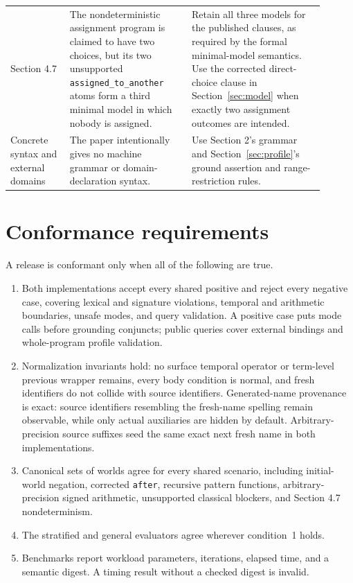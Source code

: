 \documentclass[11pt]{article}
\begin{document}
\begin{longtable}{>{\raggedright\arraybackslash}p{0.17\linewidth}
                  >{\raggedright\arraybackslash}p{0.35\linewidth}
                  >{\raggedright\arraybackslash}p{0.38\linewidth}}
Section 4.7 &
The nondeterministic assignment program is claimed to have two choices, but
its two unsupported \texttt{assigned\_to\_another} atoms form a third
minimal model in which nobody is assigned. &
Retain all three models for the published clauses, as required by the formal
minimal-model semantics.  Use the corrected direct-choice clause in
Section~\ref{sec:model} when exactly two assignment outcomes are intended. \\

Concrete syntax and external domains &
The paper intentionally gives no machine grammar or domain-declaration syntax. &
Use Section 2's grammar and Section~\ref{sec:profile}'s ground assertion and
range-restriction rules. \\
\bottomrule
\end{longtable}

\section{Conformance requirements}

A release is conformant only when all of the following are true.

\begin{enumerate}
  \item Both implementations accept every shared positive and reject every
  negative case, covering lexical and signature violations, temporal and
  arithmetic boundaries, unsafe modes, and query validation.  A positive case
  puts mode calls before grounding conjuncts; public queries cover external
  bindings and whole-program profile validation.
  \item Normalization invariants hold: no surface temporal operator or
  term-level previous wrapper remains, every body condition is normal, and
  fresh identifiers do not collide with source identifiers.  Generated-name
  provenance is exact: source identifiers resembling the fresh-name spelling
  remain observable, while only actual auxiliaries are hidden by default.
  Arbitrary-precision source suffixes seed the same exact next fresh name in
  both implementations.
  \item Canonical sets of worlds agree for every shared scenario, including
  initial-world negation, corrected \verb|after|, recursive pattern
  functions, arbitrary-precision signed arithmetic, unsupported classical
  blockers, and Section 4.7 nondeterminism.
  \item The stratified and general evaluators agree wherever condition~1
  holds.
  \item Benchmarks report workload parameters, iterations, elapsed time, and
  a semantic digest.  A timing result without a checked digest is invalid.
\end{enumerate}
\end{document}
